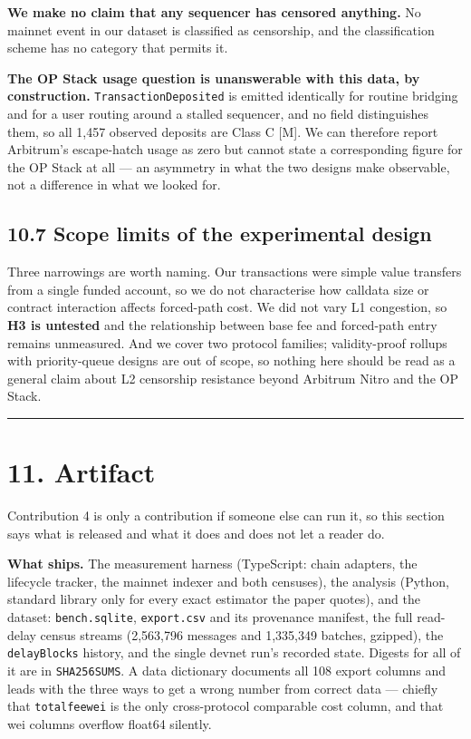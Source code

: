 \documentclass[conference]{IEEEtran}
\renewcommand{\_}{\textunderscore\allowbreak}
\begin{document}
\textbf{We make no claim that any sequencer has censored anything.} No
mainnet event in our dataset is classified as censorship, and the
classification scheme has no category that permits it.

\textbf{The OP Stack usage question is unanswerable with this data, by
construction.} \texttt{TransactionDeposited} is emitted identically for
routine bridging and for a user routing around a stalled sequencer, and
no field distinguishes them, so all 1,457 observed deposits are Class C
{[}M{]}. We can therefore report Arbitrum's escape-hatch usage as zero
but cannot state a corresponding figure for the OP Stack at all --- an
asymmetry in what the two designs make observable, not a difference in
what we looked for.

\subsection{10.7 Scope limits of the experimental
design}\label{scope-limits-of-the-experimental-design}

Three narrowings are worth naming. Our transactions were simple value
transfers from a single funded account, so we do not characterise how
calldata size or contract interaction affects forced-path cost. We did
not vary L1 congestion, so \textbf{H3 is untested} and the relationship
between base fee and forced-path entry remains unmeasured. And we cover
two protocol families; validity-proof rollups with priority-queue
designs are out of scope, so nothing here should be read as a general
claim about L2 censorship resistance beyond Arbitrum Nitro and the OP
Stack.

\begin{center}\rule{0.5\linewidth}{0.5pt}\end{center}

\section{11. Artifact}\label{artifact}

Contribution 4 is only a contribution if someone else can run it, so
this section says what is released and what it does and does not let a
reader do.

\textbf{What ships.} The measurement harness (TypeScript: chain
adapters, the lifecycle tracker, the mainnet indexer and both censuses),
the analysis (Python, standard library only for every exact estimator
the paper quotes), and the dataset: \texttt{bench.sqlite},
\texttt{export.csv} and its provenance manifest, the full read-delay
census streams (2,563,796 messages and 1,335,349 batches, gzipped), the
\texttt{delayBlocks} history, and the single devnet run's recorded
state. Digests for all of it are in \texttt{SHA256SUMS}. A data
dictionary documents all 108 export columns and leads with the three
ways to get a wrong number from correct data --- chiefly that
\texttt{total\_fee\_wei} is the only cross-protocol comparable cost
column, and that wei columns overflow float64 silently.
\end{document}
